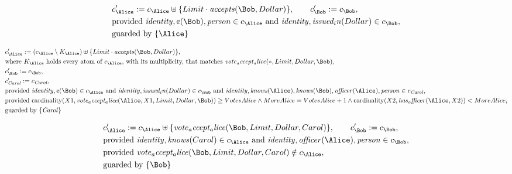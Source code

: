\begin{align*}
&
c'_
{
\Alice
}
 := 
c_
{
\Alice
}
 \uplus 
\{
Limit
\cdot
\mathit{
accepts
}
(
\Bob
,
Dollar
)
\}
, \qquad 
c'_
{
\Bob
}
 := 
c_
{
\Bob
}
,\\
&
\text{provided } 
\mathit{
identity
}
,
\text{\textcent}
(
\Bob
)
,
\mathit{
person
}
 \in c_
{
\Alice
}
 \text{ and } 
\mathit{
identity
}
,
\mathit{
issued_in
}
(
Dollar
)
 \in c_
{
\Bob
}
,\\
&
\text{guarded by } \{
\Alice
\}
\end{align*}

\begin{align*}
&
c'_
{
\Alice
}
 := 
(
c_
{
\Alice
}
 \setminus K_
{
\Alice
}
) \uplus 
\{
Limit
\cdot
\mathit{
accepts
}
(
\Bob
,
Dollar
)
\}
,\\
&
\text{where } K_
{
\Alice
}
 \text{ holds every atom of } c_
{
\Alice
}
 \text{, with its multiplicity, that matches } 
\mathit{
vote_accept_alice
}
(
\ast
,
Limit
,
Dollar
,
\Bob
)
,\\
&
c'_
{
\Bob
}
 := 
c_
{
\Bob
}
,\\
&
c'_
{
\mathit{Carol}
}
 := 
c_
{
\mathit{Carol}
}
,\\
&
\text{provided } 
\mathit{
identity
}
,
\text{\textcent}
(
\Bob
)
 \in c_
{
\Alice
}
 \text{ and } 
\mathit{
identity
}
,
\mathit{
issued_in
}
(
Dollar
)
 \in c_
{
\Bob
}
 \text{ and } 
\mathit{
identity
}
,
\mathit{
knows
}
(
\Alice
)
,
\mathit{
knows
}
(
\Bob
)
,
\mathit{
officer
}
(
\Alice
)
,
\mathit{
person
}
 \in c_
{
\mathit{Carol}
}
,\\
&
\text{provided } 
\mathrm{cardinality}(
X1
,
\mathit{
vote_accept_alice
}
(
\Alice
,
X1
,
Limit
,
Dollar
,
\Bob
)
)
\ge
VotesAlice
\land
MoreAlice
=
VotesAlice
+
1
\land
\mathrm{cardinality}(
X2
,
\mathit{
has_officer
}
(
\Alice
,
X2
)
)
<
MoreAlice
,\\
&
\text{guarded by } \{
\mathit{Carol}
\}
\end{align*}

\begin{align*}
&
c'_
{
\Alice
}
 := 
c_
{
\Alice
}
 \uplus 
\{
\mathit{
vote_accept_alice
}
(
\Bob
,
Limit
,
Dollar
,
Carol
)
\}
, \qquad 
c'_
{
\Bob
}
 := 
c_
{
\Bob
}
,\\
&
\text{provided } 
\mathit{
identity
}
,
\mathit{
knows
}
(
Carol
)
 \in c_
{
\Alice
}
 \text{ and } 
\mathit{
identity
}
,
\mathit{
officer
}
(
\Alice
)
,
\mathit{
person
}
 \in c_
{
\Bob
}
,\\
&
\text{provided } 
\mathit{
vote_accept_alice
}
(
\Bob
,
Limit
,
Dollar
,
Carol
)
 \notin c_
{
\Alice
}
,\\
&
\text{guarded by } \{
\Bob
\}
\end{align*}
